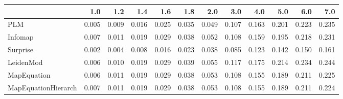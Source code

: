 \begin{tabular}{lrrrrrrrrrrr}
\toprule
{} &   1.0 &   1.2 &   1.4 &   1.6 &   1.8 &   2.0 &   3.0 &   4.0 &   5.0 &   6.0 &   7.0 \\
\midrule
PLM                 & 0.005 & 0.009 & 0.016 & 0.025 & 0.035 & 0.049 & 0.107 & 0.163 & 0.201 & 0.223 & 0.235 \\
Infomap             & 0.007 & 0.011 & 0.019 & 0.029 & 0.038 & 0.052 & 0.108 & 0.159 & 0.195 & 0.218 & 0.231 \\
Surprise            & 0.002 & 0.004 & 0.008 & 0.016 & 0.023 & 0.038 & 0.085 & 0.123 & 0.142 & 0.150 & 0.161 \\
LeidenMod           & 0.006 & 0.010 & 0.019 & 0.029 & 0.039 & 0.055 & 0.117 & 0.175 & 0.214 & 0.234 & 0.244 \\
MapEquation         & 0.006 & 0.011 & 0.019 & 0.029 & 0.038 & 0.053 & 0.108 & 0.155 & 0.189 & 0.211 & 0.225 \\
MapEquationHierarch & 0.007 & 0.011 & 0.019 & 0.029 & 0.038 & 0.053 & 0.108 & 0.155 & 0.189 & 0.211 & 0.224 \\
\bottomrule
\end{tabular}
